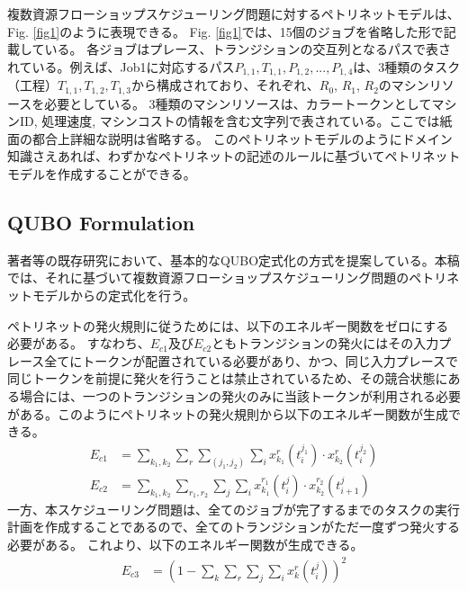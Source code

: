 \documentclass[conference]{IEEEtran}
\begin{document}
複数資源フローショップスケジューリング問題に対するペトリネットモデルは、Fig. \ref{fig1}のように表現できる。
Fig. \ref{fig1}では、15個のジョブを省略した形で記載している。
各ジョブはプレース、トランジションの交互列となるパスで表されている。例えば、Job1に対応するパス$P_{1,1}, T_{1,1}, P_{1,2}, ..., P_{1,4}$は、3種類のタスク（工程）$T_{1,1}, T_{1,2}, T_{1,3}$から構成されており、それぞれ、$R_0$, $R_1$, $R_2$のマシンリソースを必要としている。
3種類のマシンリソースは、カラートークンとしてマシンID, 処理速度, マシンコストの情報を含む文字列で表されている。ここでは紙面の都合上詳細な説明は省略する。
このペトリネットモデルのようにドメイン知識さえあれば、わずかなペトリネットの記述のルールに基づいてペトリネットモデルを作成することができる。


\subsection{QUBO Formulation}

著者等の既存研究\cite{b2}において、基本的なQUBO定式化の方式を提案している。本稿では、それに基づいて複数資源フローショップスケジューリング問題のペトリネットモデルからの定式化を行う。

ペトリネットの発火規則に従うためには、以下のエネルギー関数をゼロにする必要がある。
すなわち、$E_{c1}$及び$E_{c2}$ともトランジションの発火にはその入力プレース全てにトークンが配置されている必要があり、かつ、同じ入力プレースで同じトークンを前提に発火を行うことは禁止されているため、その競合状態にある場合には、一つのトランジションの発火のみに当該トークンが利用される必要がある。このようにペトリネットの発火規則から以下のエネルギー関数が生成できる。
\begin{align}
E_{c1} &= \sum_{k_1,k_2} \sum_r \sum_{(j_1,j_2)} \sum_i x_{k_1}^{r}(t_{i}^{j_1}) \cdot x_{k_2}^{r}(t_{i}^{j_2}) \label{eqn:presedence}\\
E_{c2} &= \sum_{k_1,k_2} \sum_{r_1,r_2} \sum_j \sum_i x_{k_1}^{r_1}(t_{i}^{j}) \cdot x_{k_2}^{r_2}(t_{i+1}^{j})  \label{eqn:conflict}
\end{align}
一方、本スケジューリング問題は、全てのジョブが完了するまでのタスクの実行計画を作成することであるので、全てのトランジションがただ一度ずつ発火する必要がある。
これより、以下のエネルギー関数が生成できる。
\begin{align}
E_{c3} &= ( 1 - \sum_k \sum_r \sum_j \sum_i x_{k}^{r}(t_{i}^{j}))^2  \label{eqn:allTasks}
\end{align}
\end{document}
